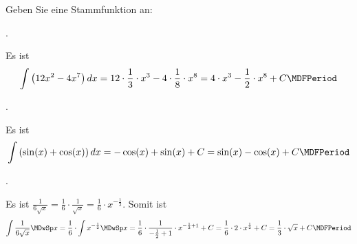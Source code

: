\begin{MExercises}

\begin{MExercise}
Geben Sie eine Stammfunktion an:
\begin{MExerciseItems}
\item{
{}.
\begin{MHint}{\iSolution}{%
Es ist
\[
\int \left(12 x^2 - 4 x^7\right) \MD x %
= 12 \cdot \frac{1}{3} \cdot x^3 - 4 \cdot \frac{1}{8} \cdot x^8 %
= 4 \cdot x^3 - \frac{1}{2} \cdot x^8 + C\MDFPeriod %
\]
}
\end{MHint}}
%
\item{
{}.
\begin{MHint}{\iSolution}{%
Es ist
\[
\int \left(\sin(x) + \cos(x)\right) \MD x %
= -\cos(x) + \sin(x) + C %
= \sin(x) - \cos(x) + C\MDFPeriod %
\]
}\end{MHint}}
\item{
{}. 
\begin{MHint}{\iSolution}{%
Es ist 
$\frac{1}{6 \sqrt{x}} = \frac{1}{6} \cdot \frac{1}{\sqrt{x}} %
= \frac{1}{6} \cdot x^{-\frac{1}{2}}$. Somit ist
\[
\int \frac{1}{6 \sqrt{x}} \MDwSp x %
= \frac{1}{6} \cdot \int x^{-\frac{1}{2}} \MDwSp x %
= \frac{1}{6} \cdot \frac{1}{-\frac{1}{2} + 1} \cdot x^{-\frac{1}{2} + 1} + C %
= \frac{1}{6} \cdot 2 \cdot x^{\frac{1}{2}} + C %
= \frac{1}{3} \cdot \sqrt{x} + C\MDFPeriod %
\]
}
\end{MHint}}
\end{MExerciseItems}
\end{MExercise}


\end{MExercises}
